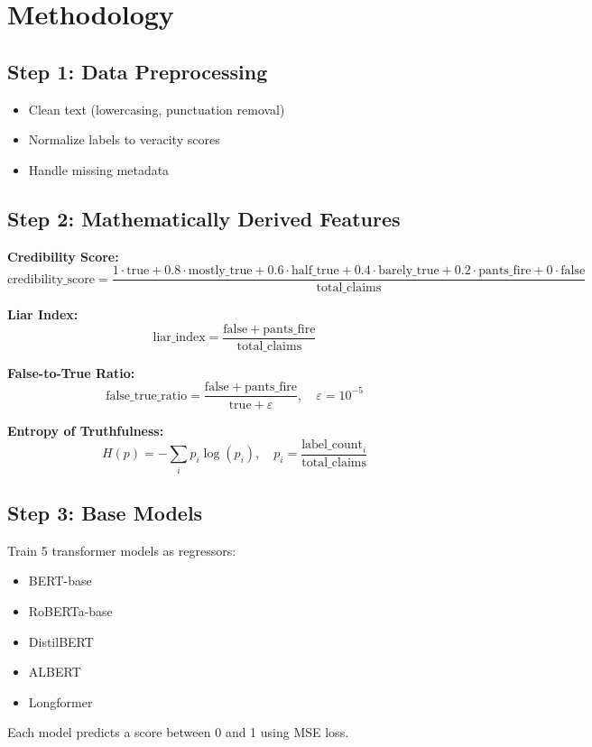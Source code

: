 \documentclass{article}
\begin{document}
\section*{Methodology}

\subsection*{Step 1: Data Preprocessing}
\begin{itemize}
  \item Clean text (lowercasing, punctuation removal)
  \item Normalize labels to veracity scores
  \item Handle missing metadata
\end{itemize}

\subsection*{Step 2: Mathematically Derived Features}

\textbf{Credibility Score:}
\[
\text{credibility\_score} = \frac{1 \cdot \mathrm{true} + 0.8 \cdot \mathrm{mostly\_true} + 0.6 \cdot \mathrm{half\_true} + 0.4 \cdot \mathrm{barely\_true} + 0.2 \cdot \mathrm{pants\_fire} + 0 \cdot \mathrm{false}}{\mathrm{total\_claims}}
\]

\textbf{Liar Index:}
\[
\text{liar\_index} = \frac{\mathrm{false} + \mathrm{pants\_fire}}{\mathrm{total\_claims}}
\]

\textbf{False-to-True Ratio:}
\[
\text{false\_true\_ratio} = \frac{\mathrm{false} + \mathrm{pants\_fire}}{\mathrm{true} + \varepsilon}, \quad \varepsilon = 10^{-5}
\]

\textbf{Entropy of Truthfulness:}
\[
H(p) = - \sum_{i} p_i \log(p_i), \quad p_i = \frac{\mathrm{label\_count}_i}{\mathrm{total\_claims}}
\]

\subsection*{Step 3: Base Models}
Train 5 transformer models as regressors:
\begin{itemize}
  \item BERT-base
  \item RoBERTa-base
  \item DistilBERT
  \item ALBERT
  \item Longformer
\end{itemize}
Each model predicts a score between 0 and 1 using MSE loss.
\end{document}
